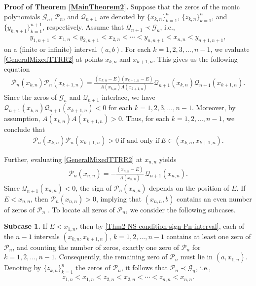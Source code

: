 \documentclass[final,3p,times,12pt]{elsarticle}
\numberwithin{equation}{section}  %
\begin{document}
{\bf{Proof of Theorem \ref{MainTheorem2}.}}
Suppose that the zeros of the monic polynomials $\mathcal{G}_{n}$, $\mathcal{P}_n$, and $\mathcal{Q}_{n+1}$ are denoted by 
$\{x_{k,n}\}_{k=1}^{n}$, $\{z_{k,n}\}_{k=1}^{n}$, and $\{y_{k,n+1}\}_{k=1}^{n+1}$, respectively. 
Assume that $\mathcal{Q}_{n+1}\prec\mathcal{G}_{n}$, i.e.,
\begin{align}
	y_{1,n+1} < x_{1,n} < y_{2,n+1} < x_{2,n} < \cdots < y_{n,n+1} < x_{n,n} < y_{n+1,n+1},
\end{align}
on a (finite or infinite) interval $(a,b)$.
For each \( k = 1, 2, 3, \ldots, n-1 \), we evaluate \eqref{GeneralMixedTTRR2} at points \( x_{k,n} \) and \( x_{k+1,n} \). This gives us the following equation
\begin{align}\label{GeneralMixedTTRR2-Evaluateatx_kandx_k+1}
	\mathcal{P}_n(x_{k,n})	\mathcal{P}_n(x_{k+1,n})=\frac{(x_{k,n}-E)(x_{k+1,n}-E)}{A(x_{k,n})A(x_{k+1,n})} \mathcal{Q}_{n+1}(x_{k,n})\mathcal{Q}_{n+1}(x_{k+1,n}).
\end{align}
Since the zeros of \( \mathcal{G}_{n} \) and \( \mathcal{Q}_{n+1} \) interlace, we have \( \mathcal{Q}_{n+1}(x_{k,n}) \mathcal{Q}_{n+1}(x_{k+1,n}) < 0 \) for each \newline \( k = 1, 2, 3, \ldots, n-1 \). Moreover, by assumption, \( A(x_{k,n}) A(x_{k+1,n}) > 0 \). Thus, for each \( k = 1, 2, \ldots, n-1 \), we conclude that
\begin{align}\label{Thm2-NS condition-sign-Pn-interval}
	\mathcal{P}_n(x_{k,n})	\mathcal{P}_n(x_{k+1,n})>0~ \text{if and only if}  ~E \in (x_{k,n},x_{k+1,n}).
\end{align}

Further, evaluating \eqref{GeneralMixedTTRR2} at $x_{n,n}$ yields 
\begin{align}\label{GeneralMixedTTRR2-at-x_nn}
	\mathcal{P}_n(x_{n,n}) = -\frac{(x_{n,n}-E)}{A(x_{n,n})}\,\mathcal{Q}_{n+1}(x_{n,n}).
\end{align}
Since $\mathcal{Q}_{n+1}(x_{n,n}) < 0$, the sign of $\mathcal{P}_n(x_{n,n})$ depends on the position of $E$. If $E < x_{n,n}$, then $\mathcal{P}_n(x_{n,n}) > 0$, implying that $(x_{n,n}, b)$ contains an even number of zeros of $\mathcal{P}_n$ . To locate all zeros of $\mathcal{P}_n$, we consider the following subcases.

\smallskip
\noindent
\textbf{Subcase 1.} If $E < x_{1,n}$, then by \eqref{Thm2-NS condition-sign-Pn-interval}, each of the $n-1$ intervals $(x_{k,n}, x_{k+1,n})$, $k=1,2, \dots,n-1$ contains at least one zero of $\mathcal{P}_n$, and counting the number of zeros, exactly one zero of $\mathcal{P}_n$ for $k = 1, 2, \ldots, n-1$. Consequently, the remaining zero of $\mathcal{P}_n$ must lie in $(a, x_{1,n})$. Denoting by $\{z_{k,n}\}_{k=1}^{n}$ the zeros of $\mathcal{P}_n$, it follows that $\mathcal{P}_n\prec\mathcal{G}_n$, i.e.,
\begin{align*}
	z_{1,n} < x_{1,n} < z_{2,n} < x_{2,n} < \cdots < z_{n,n} < x_{n,n}.
\end{align*}
\end{document}
